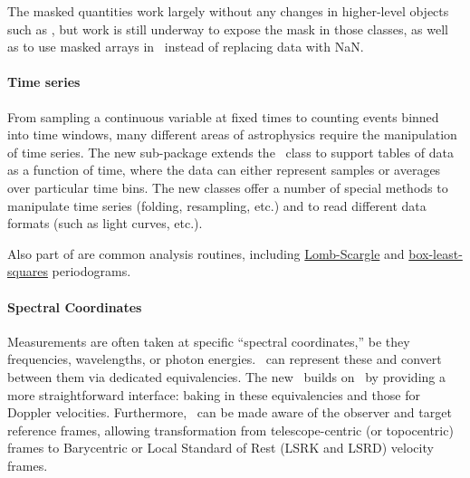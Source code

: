 \documentclass[modern]{aastex631}
\begin{document}
The masked quantities work largely without any changes in higher-level objects
such as \astropySkyCoord, but work is still underway to expose the mask in those
classes, as well as to use masked arrays in \astropyTime\ instead of replacing
data with NaN.

\paragraph{Time series}  From sampling a continuous variable at fixed times to
counting events binned into time windows, many different areas of astrophysics
require the manipulation of time series. The new 
sub-package extends the \astropyQTable\ class to support tables of data as a
function of time, where the data can either represent samples or averages over
particular time bins. The new classes offer a number of special methods to
manipulate time series (folding, resampling, etc.) and to read different data
formats (such as  light curves, etc.).

Also part of  are common analysis routines, including
\href{https://docs.astropy.org/en/stable/timeseries/lombscargle.html}{Lomb-Scargle}
and
\href{https://docs.astropy.org/en/stable/timeseries/bls.html}{box-least-squares}
periodograms.

\paragraph{Spectral Coordinates} Measurements are often taken at specific
``spectral coordinates,'' be they frequencies, wavelengths, or photon energies.
\astropyQuantity\ can represent these and convert between them via dedicated
equivalencies. The new \astropySpectralCoord\ builds on \astropyQuantity\ by
providing a more straightforward interface: baking in these equivalencies and
those for Doppler velocities. Furthermore, \astropySpectralCoord\ can be made
aware of the observer and target reference frames, allowing transformation from
telescope-centric (or topocentric) frames to Barycentric or Local Standard of
Rest (LSRK and LSRD) velocity frames.
\end{document}
